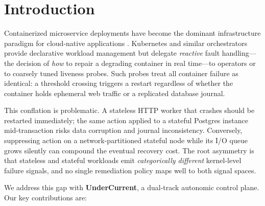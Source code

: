 \documentclass[runningheads]{llncs}
\begin{document}
\section{Introduction}
\label{sec:intro}

Containerized microservice deployments have become the dominant
infrastructure paradigm for cloud-native applications
\cite{burns2016borg,merkel2014docker}. Kubernetes and similar
orchestrators provide declarative workload management but delegate
\emph{reactive} fault handling---the decision of \emph{how} to repair
a degrading container in real time---to operators or to coarsely tuned
liveness probes. Such probes treat all container failure as identical:
a threshold crossing triggers a restart regardless of whether the
container holds ephemeral web traffic or a replicated database journal.

This conflation is problematic.  A stateless HTTP worker that crashes
should be restarted immediately; the same action applied to a stateful
Postgres instance mid-transaction risks data corruption and journal
inconsistency. Conversely, suppressing action on a network-partitioned
stateful node while its I/O queue grows silently can compound the
eventual recovery cost. The root asymmetry is that stateless and
stateful workloads emit \emph{categorically different} kernel-level
failure signals, and no single remediation policy maps well to both
signal spaces.

We address this gap with \textbf{UnderCurrent}, a dual-track autonomic
control plane. Our key contributions are:
\end{document}
